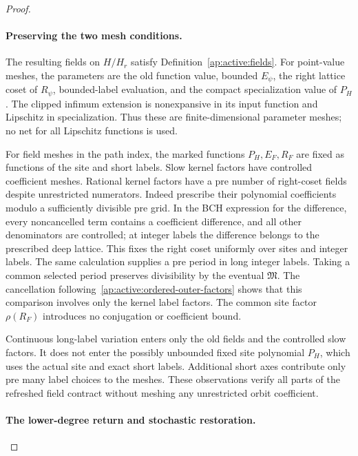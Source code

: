 \begin{proof}
\paragraph{Preserving the two mesh conditions.}
The resulting fields on $H/H_r$ satisfy
Definition~\ref{ap:active:fields}.  For point-value meshes, the
parameters are the old function value, bounded $E_\psi$, the right
lattice coset of $R_\psi$, bounded-label evaluation, and the compact
specialization value of $P_H$.  The clipped infimum extension is
nonexpansive in its input function and Lipschitz in specialization.
Thus these are finite-dimensional parameter meshes; no net for all
Lipschitz functions is used.

For field meshes in the path index, the marked functions
$P_H,E_F,R_F$ are fixed as functions of the site and short labels.
Slow kernel factors have controlled coefficient meshes.  Rational
kernel factors have a pre number of right-coset fields despite
unrestricted numerators.  Indeed prescribe their polynomial
coefficients modulo a sufficiently divisible pre grid.  In the
BCH expression for the difference, every noncancelled term contains
a coefficient difference, and all other denominators are controlled;
at integer labels the difference belongs to the prescribed deep
lattice.  This fixes the right coset uniformly over sites and
integer labels.  The same calculation supplies a pre period in
long integer labels.  Taking a common selected period preserves
divisibility by the eventual $\mathfrak M$.
The cancellation following~\eqref{ap:active:ordered-outer-factors}
shows that this comparison involves only the kernel label factors.
The common site factor $\rho(R_F)$ introduces no conjugation or
coefficient bound.

Continuous long-label variation enters only the old fields and
the controlled slow factors.  It does not enter the possibly
unbounded fixed site polynomial $P_H$, which uses the actual site
and exact short labels.  Additional short axes contribute only
pre many label choices to the meshes.  These observations verify
all parts of the refreshed field contract without meshing any
unrestricted orbit coefficient.

\paragraph{The lower-degree return and stochastic restoration.}


\end{proof}
